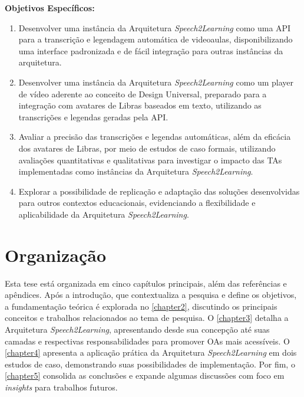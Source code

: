 \textbf{Objetivos Específicos:}

\begin{enumerate}
\item Desenvolver uma instância da Arquitetura \textit{Speech2Learning} como uma API para a transcrição e legendagem automática de videoaulas, disponibilizando uma interface padronizada e de fácil integração para outras instâncias da arquitetura.
\item Desenvolver uma instância da Arquitetura \textit{Speech2Learning} como um player de vídeo aderente ao conceito de Design Universal, preparado para a integração com avatares de Libras baseados em texto, utilizando as transcrições e legendas geradas pela API.
\item Avaliar a precisão das transcrições e legendas automáticas, além da eficácia dos avatares de Libras, por meio de estudos de caso formais, utilizando avaliações quantitativas e qualitativas para investigar o impacto das TAs implementadas como instâncias da Arquitetura \textit{Speech2Learning}.
\item Explorar a possibilidade de replicação e adaptação das soluções desenvolvidas para outros contextos educacionais, evidenciando a flexibilidade e aplicabilidade da Arquitetura \textit{Speech2Learning}.
\end{enumerate}

\section{Organização}

Esta tese está organizada em cinco capítulos principais, além das referências e apêndices. Após a introdução, que contextualiza a pesquisa e define os objetivos, a fundamentação teórica é explorada no \autoref{chapter2}, discutindo os principais conceitos e trabalhos relacionados ao tema de pesquisa. O \autoref{chapter3} detalha a Arquitetura \textit{Speech2Learning}, apresentando desde sua concepção até suas camadas e respectivas responsabilidades para promover OAs mais acessíveis. O \autoref{chapter4} apresenta a aplicação prática da Arquitetura \textit{Speech2Learning} em dois estudos de caso, demonstrando suas possibilidades de implementação. Por fim, o \autoref{chapter5} consolida as conclusões e expande algumas discussões com foco em \textit{insights} para trabalhos futuros.
